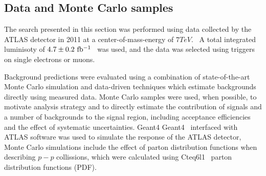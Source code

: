 
\subsection{Data and Monte Carlo samples}\label{sect:samples}

The search presented in this section was performed using data collected by the ATLAS detector in 2011 at a center-of-mass-energy of $7 TeV$.~\cite{1748-0221-3-08-S08003}
A total integrated luminisoty of $4.7\pm0.2~\mbox{fb$^{-1}$}{}$~\cite{Aad:2011dr,ATLAS-CONF-2011-116} was used, and the data was selected using triggers on single electrons or muons.




Background predictions were evaluated using a combination of state-of-the-art Monte Carlo simulation and data-driven techniques which estimate backgrounds directly using measured data.
Monte Carlo samples were used, when possible, to motivate analysis strategy and to directly estimate the contribution of signals and a number of backgrounds to the signal region, including acceptance efficiencies and the effect of systematic uncertainties.
Geant4 {\sc Geant4}~\cite{Agostinelli:2002hh} interfaced with ATLAS software was used to simulate the response of the ATLAS detector,
Monte Carlo simulations include the effect of parton distribution functions when describing $p-p$ collissions, which were calculated using {\sc Cteq6l1}~\cite{Pumplin:2002vw} parton distribution functions (PDF).

